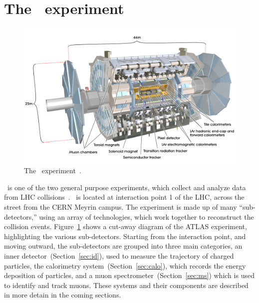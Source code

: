 \FloatBarrier
\section{The \atlas\ experiment}

\begin{figure}[ht]
  \centering
  \includegraphics[width=\textwidth, clip=true, trim=0 0 0 0]
    {figs/lhc/atlas_det.jpg}
  \caption{
    The \atlas\ experiment~\cite{Pequenao:1095924}.
  }
  \label{fig:atlas_det}
\end{figure}

\atlas\ is one of the two general purpose experiments, which
collect and analyze data from LHC collisions~\cite{cern-jinst-atlas}.
\atlas\ is located at interaction point 1 of the LHC, across the street from
the CERN Meyrin campus.
The experiment is made up of many ``sub-detectors,'' using an array of
technologies, which work together to reconstruct the collision events.
Figure~\ref{fig:atlas_det} shows a cut-away diagram of the ATLAS experiment,
highlighting the various sub-detectors.
Starting from the interaction point, and moving outward, the sub-detectors
are grouped into three main categories, an inner
detector~(Section~\ref{sec:id}), used to measure the trajectory of charged
particles, the calorimetry system~(Section~\ref{sec:calo}), which records the
energy deposition of particles, and a muon spectrometer~(Section~\ref{sec:ms})
which is used to identify and track muons.
These systems and their components are described in more detain in the coming
sections.

\FloatBarrier
